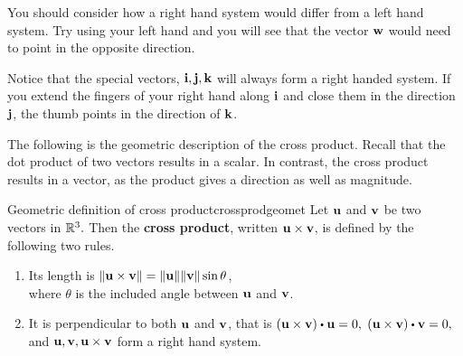 You should consider how a right hand
system would differ from a left hand system. Try using your left hand and
you will see that the vector ${\bf w}$ would need to point in the
opposite direction.

Notice that the special vectors, ${\bf i},{\bf j},{\bf k}$ will always form a right handed
system. If you extend the fingers of your right hand along ${\bf i}$ and 
close them in the direction ${\bf j}$, the thumb points
in the direction of ${\bf k}$.

\begin{center}
\end{center}

The following is the geometric description of the cross product. Recall that the dot product of 
two vectors results in a scalar. In contrast, the cross product results in a vector, as the product gives
a direction as well as magnitude.

\begin{definition}{Geometric definition of cross product}{crossprodgeomet}
Let ${\bf u}$ and ${\bf v}$ be two vectors in $\mathbb{R}^{3}.$ 
Then the \textbf{cross product}, written ${\bf u}\times {\bf v}$, is defined by
 the following two rules.

\begin{enumerate}
\item Its length is $\| {\bf u}\times {\bf v}\| =\| {\bf u}\| \|
{\bf v}\| \sin \theta $, \\
where $\theta $ is the included angle between ${\bf u}$ and ${\bf v}$.

\item It is perpendicular to both ${\bf u}$ and ${\bf v}$, that is $\left( \vect{u}\times \vect{v} \right) \dotprod \vect{u}=0,$ $\left( \vect{u}\times \vect{v} \right) \dotprod \vect{v}=0,$ \\
and  ${\bf u},{\bf v},{\bf u}\times {\bf v}$ form a right hand system.
\end{enumerate}
\end{definition}

